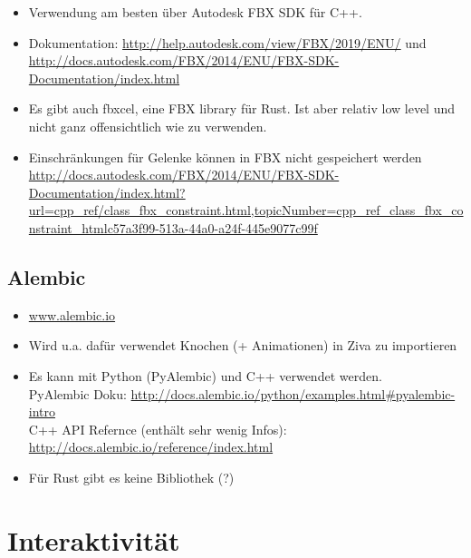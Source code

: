 \begin{itemize}
 \item Verwendung am besten über Autodesk FBX SDK für C++. 
 \item Dokumentation: \url{http://help.autodesk.com/view/FBX/2019/ENU/} und \url{http://docs.autodesk.com/FBX/2014/ENU/FBX-SDK-Documentation/index.html}
 \item Es gibt auch fbxcel, eine FBX library für Rust. Ist aber relativ low level und nicht ganz offensichtlich wie zu verwenden.
 \item Einschränkungen für Gelenke können in FBX nicht gespeichert werden \url{http://docs.autodesk.com/FBX/2014/ENU/FBX-SDK-Documentation/index.html?url=cpp_ref/class_fbx_constraint.html,topicNumber=cpp_ref_class_fbx_constraint_htmlc57a3f99-513a-44a0-a24f-445e9077c99f}
\end{itemize}

\subsection{Alembic}

\begin{itemize}
 \item \url{www.alembic.io}
 \item Wird u.a. dafür verwendet Knochen (+ Animationen) in Ziva zu importieren
 \item Es kann mit Python (PyAlembic) und C++ verwendet werden.\\
 PyAlembic Doku: \url{http://docs.alembic.io/python/examples.html#pyalembic-intro}\\
 C++ API Refernce (enthält sehr wenig Infos): \url{http://docs.alembic.io/reference/index.html}
 \item Für Rust gibt es keine Bibliothek (?)
\end{itemize}

\section{Interaktivität}

